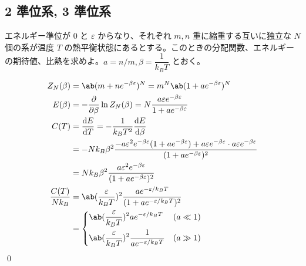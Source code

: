 \documentclass[uplatex,dvipdfmx,a4paper,11pt]{jlreq}
\makeatletter
\numberwithin{equation}{section}
\theoremstyle{definition}
\renewenvironment{proof}[1][\proofname]{\par
  \normalfont
  \topsep6\p@\@plus6\p@ \trivlist
  \item[\hskip\labelsep{\bfseries #1}\@addpunct{\bfseries}]\ignorespaces\quad\par
}{%
  \qed\endtrivlist\@endpefalse
}
\renewcommand\proofname{証明}
\makeatother
\begin{document}
\subsection{2 準位系, 3 準位系}

\begin{problem}
エネルギー準位が $0$ と $\varepsilon$ からなり、それぞれ $m, n$ 重に縮重する互いに独立な $N$ 個の系が温度 $T$ の熱平衡状態にあるとする。このときの分配関数、エネルギーの期待値、比熱を求めよ。$a = n/m, \beta = \dfrac{1}{k_BT}$ とおく。
\end{problem}
\begin{proof}
  \begin{align}
    Z_N(\beta)        & = \ab(m + ne^{-\beta \varepsilon})^N = m^N\ab(1 + ae^{-\beta \varepsilon})^N                                                                                                                         \\
    E(\beta)          & = -\diffp{}{\beta}\ln Z_N(\beta) = N\frac{a\varepsilon e^{-\beta \varepsilon}}{1 + ae^{-\beta \varepsilon}}                                                                                          \\
    C(T)              & = \diff{E}{T} = -\frac{1}{k_BT^2}\diff{E}{\beta}                                                                                                                                                     \\
                      & = -Nk_B\beta^2\frac{-a\varepsilon^2 e^{-\beta\varepsilon}(1 + ae^{-\beta \varepsilon}) + a\varepsilon e^{-\beta\varepsilon}\cdot a\varepsilon e^{-\beta\varepsilon}}{(1 + ae^{-\beta\varepsilon})^2} \\
                      & = Nk_B\beta^2\frac{a\varepsilon^2 e^{-\beta\varepsilon}}{(1 + ae^{-\beta\varepsilon})^2}                                                                                                             \\
    \frac{C(T)}{Nk_B} & = \ab(\frac{\varepsilon}{k_BT})^2\frac{ae^{-\varepsilon/k_BT}}{(1 + ae^{-\varepsilon/k_BT})^2}                                                                                                       \\
                      & = \begin{dcases}
                            \ab(\frac{\varepsilon}{k_BT})^2 ae^{-\varepsilon/k_BT}          & (a \ll 1) \\
                            \ab(\frac{\varepsilon}{k_BT})^2\frac{1}{ae^{-\varepsilon/k_BT}} & (a \gg 1)
                          \end{dcases}
  \end{align}
\end{proof}
\end{document}

